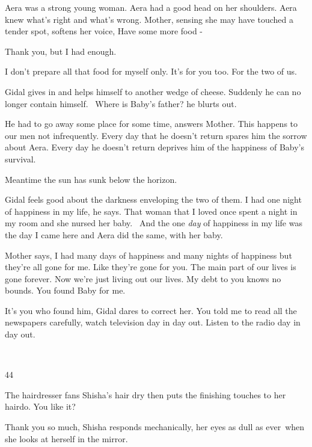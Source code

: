 \documentclass[letterpaper]{article}
\begin{document}
{\textquotedbl}Aera was a strong young woman. Aera had a good head on her shoulders. Aera knew what's right and what's
wrong.{\textquotedbl} Mother, sensing she may have touched a tender spot, softens her voice, {\textquotedbl}Have some
more food -{\textquotedbl} 

{\textquotedbl}Thank you, but I had enough.{\textquotedbl}

{\textquotedbl}I don't prepare all that food for myself only. It's for you too. For the two of us.{\textquotedbl}

Gidal gives in and helps himself to another wedge of cheese. Suddenly he can no longer contain himself.
\ {\textquotedbl}Where is Baby's father?{\textquotedbl} he blurts out.

{\textquotedbl}He had to go away some place for some time,{\textquotedbl} answers Mother. {\textquotedbl}This happens to
our men not infrequently. Every day that he doesn't return spares him the sorrow about Aera. Every day he doesn't
return deprives him of the happiness of Baby's survival. {\textquotedbl} 

Meantime the sun has sunk below the horizon. 

Gidal feels good about the darkness enveloping the two of them. {\textquotedbl}I had one night of happiness in my
life,{\textquotedbl} he says. {\textquotedbl}That woman that I loved once spent a night in my room and she nursed her
baby. \ And the{ }one \textit{day }of happiness in my life was the day I came
here and Aera did the same, with her baby.{\textquotedbl} 

Mother says, {\textquotedbl}I had many days of happiness and many nights of happiness but they're all gone for me. Like
they're gone for you. The main part of our lives is gone forever. Now we're just living out our lives. My debt to you
knows no bounds. You found Baby for me.{\textquotedbl} 

{\textquotedbl}It's you who found him,{\textquotedbl} Gidal dares to correct her. {\textquotedbl}You told me to read all
the newspapers carefully, watch television day in day out. Listen to the radio{ }day in day
out.{\textquotedbl}

~

44 

The hairdresser fans Shisha's hair dry then puts the finishing touches to her hairdo. {\textquotedbl}You like
it?{\textquotedbl} 

{\textquotedbl}Thank you so much,{\textquotedbl} Shisha responds mechanically, her eyes as dull as ever~when she looks
at herself in the mirror. 
\end{document}
